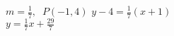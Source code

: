 {$m = \frac{1}{7}, \;\; P(-1, 4)$}
{$y - 4 = \frac{1}{7}(x + 1)$ \\ $y = \frac{1}{7}x + \frac{29}{7}$}